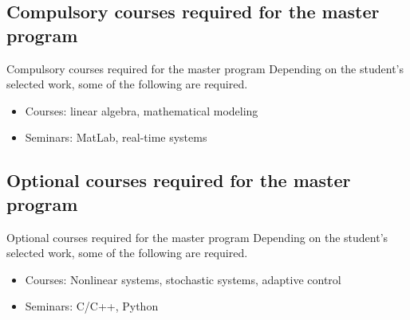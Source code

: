 \documentclass{beamer}
\begin{document}
\subsection{Compulsory courses required for the master program}
\begin{frame}{Compulsory courses required for the master program}
	Depending on the student's selected work, some of the following are required.
	\begin{itemize}
		\item Courses: linear algebra, mathematical modeling
		\item Seminars: MatLab, real-time systems
	\end{itemize}
\end{frame}
\subsection{Optional courses required for the master program}
\begin{frame}{Optional courses required for the master program}
	Depending on the student's selected work, some of the following are required.
	\begin{itemize}
		\item Courses: Nonlinear systems, stochastic systems, adaptive control
		\item Seminars: C/C++, Python
	\end{itemize}
\end{frame}
\appendix
\begin{frame}{}
\end{frame}
\end{document}
